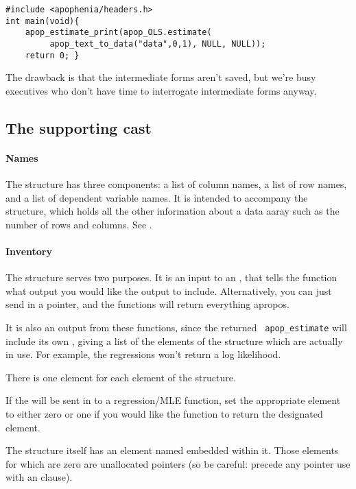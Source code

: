 \begin{lstlisting}
#include <apophenia/headers.h>
int main(void){
    apop_estimate_print(apop_OLS.estimate(
         apop_text_to_data("data",0,1), NULL, NULL));
    return 0; }
\end{lstlisting}

The drawback is that the intermediate forms aren't saved, but we're busy
executives who don't have time to interrogate intermediate forms anyway.

\subsection{The supporting cast}
\paragraph{Names}
The  structure has three components: a list of column
names, a list of row names, and a list of dependent variable names. It
is intended to accompany the  structure, which holds
all the other information about a data aaray such as the number of rows
and columns.  See .

\paragraph{Inventory}
The  structure serves two purposes. It is an input
to an , that tells the function what output you
would like the  output to include.  Alternatively, you
can just send in a  pointer, and the functions will return
everything apropos.

It is also an output from these functions, since the returned {\tt
apop\_estimate} will include its own ,
giving a list of the elements of the structure which are
actually in use. For example, the regressions won't return a log
likelihood.

There is one element for each element of the  structure.

If the  will be sent in to a regression/MLE
function, set the appropriate element to either zero or one if you would
like the function to return the designated  element.

The  structure itself has an 
element named  embedded within it. Those elements for
which  are zero are unallocated pointers (so be careful:
precede any pointer use with an  clause).

